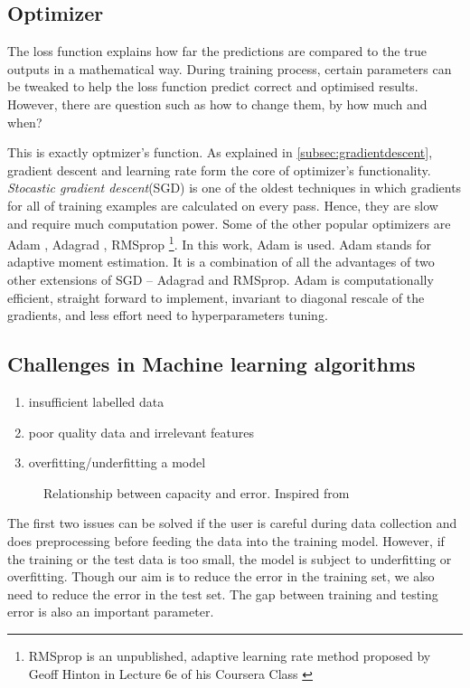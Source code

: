 \subsection{Optimizer}
\label{subsec:optimizer}
The loss function explains how far the predictions are compared to the true
outputs in a mathematical way. During training process, certain parameters can be tweaked
to help the loss function predict correct and optimised results. However, there are
question such as how to change them, by how much and when?

This is exactly optmizer's function. As explained in \ref{subsec:gradientdescent}, gradient
descent and learning rate form the core of optimizer's functionality. \textit{Stocastic
gradient descent}(SGD) is one of the oldest techniques in which gradients for all of
training examples are calculated on every pass. Hence, they are slow
and require much computation power. Some of the other popular optimizers are Adam
\cite{kingma2014adam}, Adagrad \cite{adagradpaper}, RMSprop \footnote{RMSprop is an unpublished, adaptive learning rate
method proposed by Geoff Hinton in Lecture 6e of his Coursera Class \cite{RMSProp}}. In this work, Adam is used. Adam stands for adaptive moment estimation.
It is a combination of all the advantages of two other extensions of SGD -- Adagrad and
RMSprop. Adam is computationally efficient, straight forward to implement, invariant to
diagonal rescale of the gradients, and less effort need to hyperparameters tuning.

\subsection{Challenges in Machine learning algorithms}
\begin{enumerate}
    \item insufficient labelled data
    \item poor quality data and irrelevant features
    \item overfitting/underfitting a model
\end{enumerate}
\begin{figure}[h]
	\centering
    \def\svgwidth{0.8\textwidth}
    \caption{Relationship between capacity and error. Inspired from
    \cite{Goodfellow-et-al-2016}}
    \label{fig:overfittingunderfitting}
\end{figure}

The first two issues can be solved if the user is careful during data collection and does
preprocessing before feeding the data into the training model. However, if the training or
the test data is too small, the model is subject to underfitting or overfitting. Though
our aim is to reduce the error in the training set, we also need to reduce the error in
the test set. The gap between training and testing error is also an important parameter.

